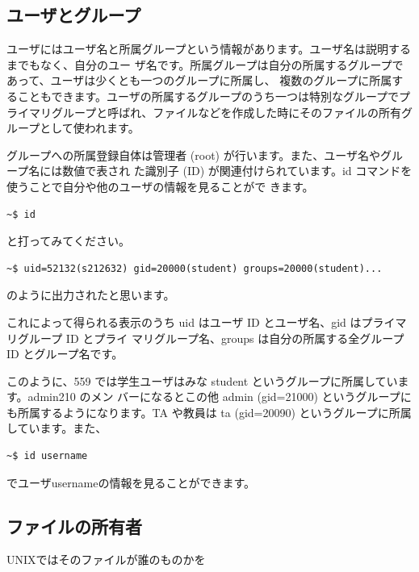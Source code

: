 \documentclass[a4j]{ltjreport}
\begin{document}
    \subsection{ユーザとグループ}
    ユーザにはユーザ名と所属グループという情報があります。ユーザ名は説明するまでもなく、自分のユー
    ザ名です。所属グループは自分の所属するグループであって、ユーザは少くとも一つのグループに所属し、
    複数のグループに所属することもできます。ユーザの所属するグループのうち一つは特別なグループでプ
    ライマリグループと呼ばれ、ファイルなどを作成した時にそのファイルの所有グループとして使われます。

    グループへの所属登録自体は管理者 (root) が行います。また、ユーザ名やグループ名には数値で表され
    た識別子 (ID) が関連付けられています。id コマンドを使うことで自分や他のユーザの情報を見ることがで
    きます。

    \vspace*{1mm}
    \begin{lstlisting}[numbers=none]
        ~$ id
    \end{lstlisting}
    \vspace*{1mm}
    と打ってみてください。

    \vspace*{1mm}
    \begin{lstlisting}[numbers=none]
        ~$ uid=52132(s212632) gid=20000(student) groups=20000(student)...
    \end{lstlisting}
    \vspace*{1mm}
    のように出力されたと思います。

    これによって得られる表示のうち uid はユーザ ID とユーザ名、gid はプライマリグループ ID とプライ
    マリグループ名、groups は自分の所属する全グループ ID とグループ名です。

    このように、559 では学生ユーザはみな student というグループに所属しています。admin210 のメン
    バーになるとこの他 admin (gid=21000) というグループにも所属するようになります。TA や教員は
    ta (gid=20090) というグループに所属しています。また、

    \vspace*{1mm}
    \begin{lstlisting}[numbers=none]
        ~$ id username
    \end{lstlisting}
    \vspace*{1mm}
    でユーザusernameの情報を見ることができます。


    \subsection{ファイルの所有者}
    UNIXではそのファイルが誰のものかを
\end{document}
